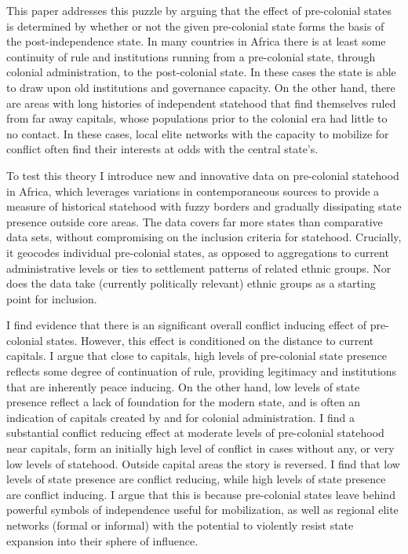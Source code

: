 \documentclass[12pt]{article}
\begin{document}
This paper addresses this puzzle by arguing that the effect of pre-colonial
states is determined by whether or not the given pre-colonial state forms the
basis of the post-independence state. In many countries in Africa there is at
least some continuity of rule and institutions running from a pre-colonial
state, through colonial administration, to the post-colonial state. In these
cases the state is able to draw upon old institutions and governance capacity.
On the other hand, there are areas with long histories of independent statehood
that find themselves ruled from far away capitals, whose populations prior to
the colonial era had little to no contact. In these cases, local elite networks
with the capacity to mobilize for conflict often find their interests at odds
with the central state's.

To test this theory I introduce new and innovative data on pre-colonial
statehood in Africa, which leverages variations in contemporaneous sources to
provide a measure of historical statehood with fuzzy borders and gradually
dissipating state presence outside core areas. The data covers far more states
than comparative data sets, without compromising on the inclusion criteria for
statehood. Crucially, it geocodes individual pre-colonial states, as opposed to
aggregations to current administrative levels or ties to settlement patterns of
related ethnic groups. Nor does the data take (currently politically relevant)
ethnic groups as a starting point for inclusion.

I find evidence that there is an significant overall conflict inducing effect of
pre-colonial states. However, this effect is conditioned on the distance to
current capitals. I argue that close to capitals, high levels of pre-colonial
state presence reflects some degree of continuation of rule, providing
legitimacy and institutions that are inherently peace inducing. On the other hand,
low levels of state presence reflect a lack of foundation for the modern state,
and is often an indication of capitals created by and for colonial
administration. I find a substantial conflict reducing effect at moderate levels
of pre-colonial statehood near capitals, form an initially high level of
conflict in cases without any, or very low levels of statehood. Outside capital
areas the story is reversed. I find that low levels of state presence are
conflict reducing, while high levels of state presence are conflict inducing. I
argue that this is because pre-colonial states leave behind powerful symbols of
independence useful for mobilization, as well as regional elite networks (formal
or informal) with the potential to violently resist state expansion into their
sphere of influence.
\end{document}
